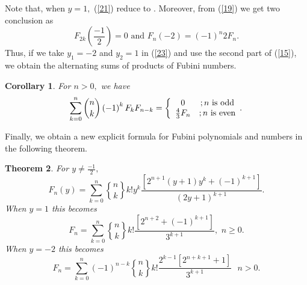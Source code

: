 \documentclass{article}%
\newtheorem{theorem}{Theorem}
\newtheorem{corollary}[theorem]{Corollary}
\begin{document}
Note that, when $y=1,$ (\ref{21}) reduce to \cite[Thereom 4.2]{GuoandQi}.
Moreover, from (\ref{19}) we get two conclusion as%
\begin{equation}
F_{2k}\left(  \frac{-1}{2}\right)  =0\text{ and }F_{n}\left(  -2\right)
=\left(  -1\right)  ^{n}2F_{n}. \label{15}%
\end{equation}
Thus, if we take $y_{1}=-2$ and $y_{2}=1$ in (\ref{23}) and use the second
part of (\ref{15}), we obtain the alternating sums of products of Fubini numbers.

\begin{corollary}
For $n>0,$ we have%
\begin{equation}
\sum_{k=0}^{n}\binom{n}{k}\left(  -1\right)  ^{k}F_{k}F_{n-k}=\left\{
\begin{array}
[c]{cc}%
0 & ;n\text{ is odd}\\
\frac{4}{3}F_{n} & ;n\text{ is even}%
\end{array}
.\right.  \label{17}%
\end{equation}

\end{corollary}

Finally, we obtain a new explicit formula for Fubini polynomials and numbers
in the following theorem.

\begin{theorem}
\label{teo5}For $y\neq\frac{-1}{2},$
\begin{equation}
F_{n}\left(  y\right)  =\sum_{k=0}^{n}%
\genfrac{\{}{\}}{0pt}{}{n}{k}%
k!y^{k}\frac{\left[  2^{n+1}\left(  y+1\right)  y^{k}+\left(  -1\right)
^{k+1}\right]  }{\left(  2y+1\right)  ^{k+1}}. \label{84}%
\end{equation}
When $y=1$ this becomes%
\begin{equation}
F_{n}=\sum_{k=0}^{n}%
\genfrac{\{}{\}}{0pt}{}{n}{k}%
k!\frac{\left[  2^{n+2}+\left(  -1\right)  ^{k+1}\right]  }{3^{k+1}},\text{
\ }n\geq0. \label{85}%
\end{equation}
When $y=-2$ this becomes%
\begin{equation}
F_{n}=\sum_{k=0}^{n}\left(  -1\right)  ^{n-k}%
\genfrac{\{}{\}}{0pt}{}{n}{k}%
k!\frac{2^{k-1}\left[  2^{n+k+1}+1\right]  }{3^{k+1}}\text{ \ }n>0. \label{86}%
\end{equation}

\end{theorem}
\end{document}
